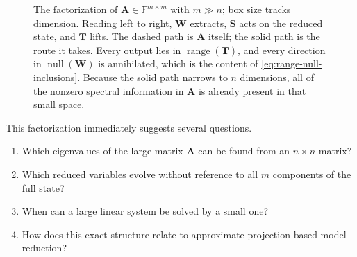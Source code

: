 \documentclass[11pt]{article}
\newcommand{\F}{\mathbb{F}}
\newcommand{\mat}[1]{\mathbf{#1}}
\newcommand{\range}{\operatorname{range}}
\newcommand{\nullsp}{\operatorname{null}}
\theoremstyle{definition}
\theoremstyle{remark}
\begin{document}
\begin{figure}[!ht]
  \centering
  \caption{The factorization of \(\mat{A}\in\F^{m\times m}\) with \(m\gg n\); box size tracks dimension. Reading left to right, \(\mat{W}\) extracts, \(\mat{S}\) acts on the reduced state, and \(\mat{T}\) lifts. The dashed path is \(\mat{A}\) itself; the solid path is the route it takes. Every output lies in \(\range(\mat{T})\), and every direction in \(\nullsp(\mat{W})\) is annihilated, which is the content of \cref{eq:range-null-inclusions}. Because the solid path narrows to \(n\) dimensions, all of the nonzero spectral information in \(\mat{A}\) is already present in that small space.}
  \label{fig:geometry}
\end{figure}

This factorization immediately suggests several questions.
\begin{enumerate}[label=\arabic*.]
  \item Which eigenvalues of the large matrix \(\mat{A}\) can be found from an \(n\times n\) matrix?
  \item Which reduced variables evolve without reference to all \(m\) components of the full state?
  \item When can a large linear system be solved by a small one?
  \item How does this exact structure relate to approximate projection-based model reduction?
\end{enumerate}
\end{document}
